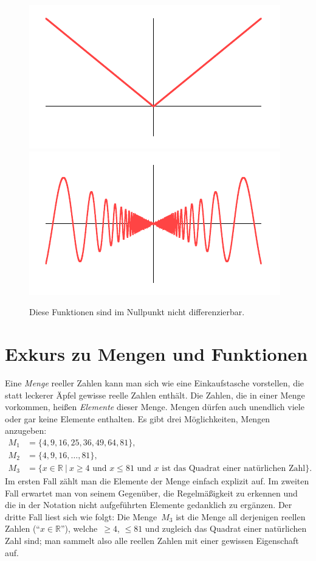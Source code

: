\documentclass[twoside]{../zirkelblatt}
\newcommand{\RR}{\mathbb{R}}
\theoremstyle{definition}
\theoremstyle{plain}
\theoremstyle{remark}
\begin{document}
\begin{figure}[b]
  \centering
  \includegraphics{sdg-nicht-diffbar1}
  \includegraphics{sdg-nicht-diffbar2}
  \caption{\label{fig:nicht-diffbar}Diese Funktionen sind im Nullpunkt nicht
  differenzierbar.}
\end{figure}


\section{Exkurs zu Mengen und Funktionen}

Eine \emph{Menge} reeller Zahlen kann man sich wie eine Einkaufstasche
vorstellen, die statt leckerer Äpfel gewisse reelle Zahlen enthält. Die Zahlen,
die in einer Menge vorkommen, heißen \emph{Elemente} dieser Menge. Mengen
dürfen auch unendlich viele oder gar keine Elemente enthalten. Es gibt drei
Möglichkeiten, Mengen anzugeben:
\begin{align*}
  M_1 &= \{ 4, 9, 16, 25, 36, 49, 64, 81 \}, \\
  M_2 &= \{ 4, 9, 16, \ldots, 81 \}, \\
  M_3 &= \{ x \in \RR \ |\ \text{$x \geq 4$ und $x \leq 81$ und $x$ ist das Quadrat
  einer natürlichen Zahl} \}.
\end{align*}
Im ersten Fall zählt man die Elemente der Menge einfach explizit auf. Im
zweiten Fall erwartet man von seinem Gegenüber, die Regelmäßigkeit zu erkennen
und die in der Notation nicht aufgeführten Elemente gedanklich zu ergänzen. Der
dritte Fall liest sich wie folgt: Die Menge~$M_3$ ist die Menge all derjenigen
reellen Zahlen ("`$x \in \RR$"'), welche~$\geq 4$, $\leq 81$ und zugleich das
Quadrat einer natürlichen Zahl sind; man sammelt also alle reellen Zahlen mit
einer gewissen Eigenschaft auf.
\end{document}
